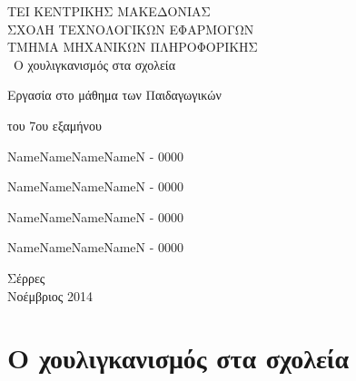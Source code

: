 \documentclass[12pt,a4paper,oneside]{book}
\begin{document}
\begin{titlepage}

\begin{center}
\Large ΤΕΙ ΚΕΝΤΡΙΚΗΣ ΜΑΚΕΔΟΝΙΑΣ \\
\large ΣΧΟΛΗ ΤΕΧΝΟΛΟΓΙΚΩΝ ΕΦΑΡΜΟΓΩΝ\\
ΤΜΗΜΑ ΜΗΧΑΝΙΚΩΝ ΠΛΗΡΟΦΟΡΙΚΗΣ \\

\vspace*{5cm}
\Huge \,\,\,Ο χουλιγκανισμός στα σχολεία

\large Eργασία στο μάθημα των Παιδαγωγικών

 του 7ου εξαμήνου
 \vspace*{4cm}
 
NameNameNameNameN - 0000

NameNameNameNameN - 0000

NameNameNameNameN - 0000

NameNameNameNameN - 0000 

 \vspace*{2.5cm}
 \nopagebreak
Σέρρες\\
Νοέμβριος 2014

\end{center}

\end{titlepage}


\chapter*{Ο χουλιγκανισμός στα σχολεία}
\end{document}
